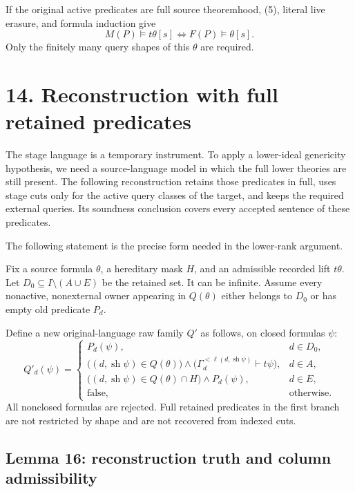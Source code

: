 \documentclass[
  11pt,
  letterpaper,
]{article}
\begin{document}
If the original active predicates are full source theoremhood, (5),
literal live erasure, and formula induction give \[
M(P)\models t\theta[s]\iff F(P)\models\theta[s].
\tag{6}
\] Only the finitely many query shapes of this \(\theta\) are required.

\section{14. Reconstruction with full retained
predicates}\label{reconstruction-with-full-retained-predicates}

The stage language is a temporary instrument. To apply a lower-ideal
genericity hypothesis, we need a source-language model in which the full
lower theories are still present. The following reconstruction retains
those predicates in full, uses stage cuts only for the active query
classes of the target, and keeps the required external queries. Its
soundness conclusion covers every accepted sentence of these predicates.

The following statement is the precise form needed in the lower-rank
argument.

Fix a source formula \(\theta\), a hereditary mask \(H\), and an
admissible recorded lift \(t\theta\). Let
\(D_0\subseteq I\setminus(A\cup E)\) be the retained set. It can be
infinite. Assume every nonactive, nonexternal owner appearing in
\(Q(\theta)\) either belongs to \(D_0\) or has empty old predicate
\(P_d\).

Define a new original-language raw family \(Q'\) as follows, on closed
formulas \(\psi\): \[
Q'_d(\psi)=
\begin{cases}
P_d(\psi),&d\in D_0,\\
\bigl((d,\operatorname{sh}\psi)\in Q(\theta)\bigr)
\land\bigl(\Gamma_d^{<\ell(d,\operatorname{sh}\psi)}\vdash t\psi\bigr),
&d\in A,\\
\bigl((d,\operatorname{sh}\psi)\in Q(\theta)\cap H\bigr)\land P_d(\psi),
&d\in E,\\
\text{false},&\text{otherwise}.
\end{cases}
\tag{7}
\] All nonclosed formulas are rejected. Full retained predicates in the
first branch are not restricted by shape and are not recovered from
indexed cuts.

\subsection{Lemma 16: reconstruction truth and column
admissibility}\label{lemma-16-reconstruction-truth-and-column-admissibility}
\end{document}
